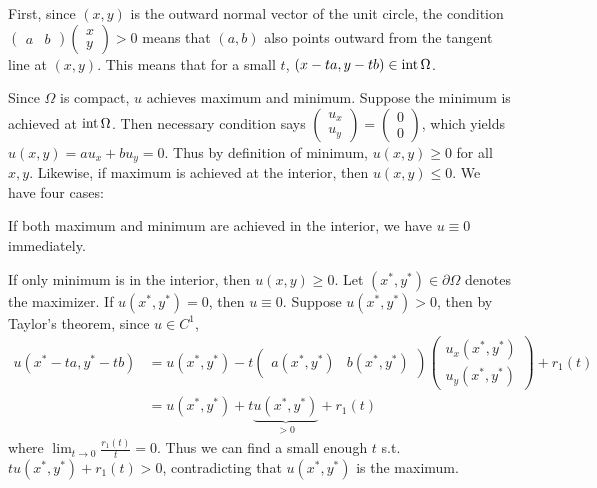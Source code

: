 \documentclass[12pt]{article}
\begin{document}
\begin{problem}[4]
	First, since $ (x,y)$ is the outward normal vector of the unit circle, the condition  $ \begin{pmatrix} a&b \end{pmatrix} \begin{pmatrix} x\\y \end{pmatrix} >0$ means that $ (a,b)$ also points outward from the tangent line at $ (x,y)$. This means that for a small $ t$, $ (x-ta,y-tb) \in \operatorname{int} \Omega$.

Since $ \Omega$ is compact, $ u$ achieves maximum and minimum. Suppose the minimum is achieved at $ \operatorname{int} \Omega$. Then necessary condition says $ \begin{pmatrix} u_x\\u_y \end{pmatrix}  = \begin{pmatrix} 0\\0 \end{pmatrix} $, which yields $ u(x,y) = au_x+bu_y = 0$. Thus by definition of minimum, $ u(x,y) \geq 0$ for all $ x,y$. Likewise, if maximum is achieved at the interior, then $ u(x,y) \leq 0$. We have four cases:
 \begin{case}[1] If both maximum and minimum are achieved in the interior, we have $ u \equiv 0$ immediately.
\end{case}
\begin{case}[2] If only minimum is in the interior, then $ u(x,y) \geq 0$. Let  $ (x^* ,y^* ) \in \partial \Omega$ denotes the maximizer. If $ u(x^* ,y^* ) = 0$, then $ u \equiv 0$. Suppose  $ u(x^* ,y^* )>0$, then by Taylor's theorem, since $ u \in C^{1}$,
\begin{align*}
	u(x^* -ta,y^* -tb) &= u(x^* ,y^* )-t \begin{pmatrix} a(x^* ,y^* ) & b(x^* ,y^* )\end{pmatrix} \begin{pmatrix} u_x(x^* ,y^* ) \\u_y(x^* ,y^* )\end{pmatrix} + r_1(t) \\
	&= u(x^* ,y^* ) + t \underbrace{ u(x^* ,y^* )}_{>0 }  + r_1(t)
\end{align*}
where $ \lim_{ t \to 0}  \frac{r_1(t)}{t } = 0$. Thus we can find a small enough $ t$  s.t.\ $ tu(x^* ,y^* )+r_1(t) >0$, contradicting that $ u(x^* ,y^* )$ is the maximum.
\end{case}


\end{problem}
\end{document}
